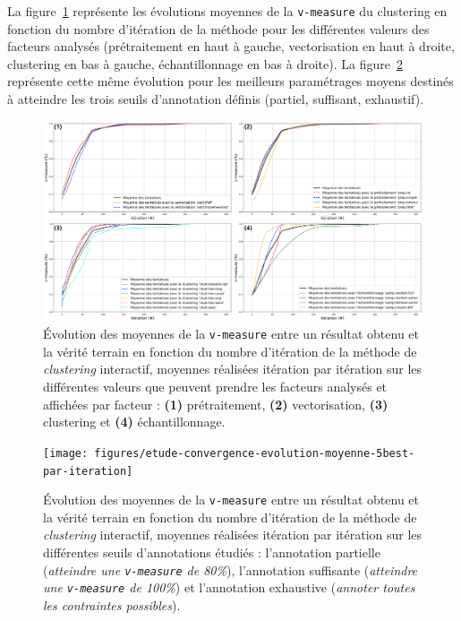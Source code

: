			
				La figure~\ref{figure:4.2.1-ETUDE-CONVERGENCE-EVOLUTION-PAR-FACTEURS} représente les évolutions moyennes de la \texttt{v-measure} du clustering en fonction du nombre d'itération de la méthode pour les différentes valeurs des facteurs analysés (prétraitement en haut à gauche, vectorisation en haut à droite, clustering en bas à gauche, échantillonnage en bas à droite).
				La figure~\ref{figure:4.2.1-ETUDE-CONVERGENCE-EVOLUTION-MEILLEUR-PARAMETRAGE} représente cette même évolution pour les meilleurs paramétrages moyens destinés à atteindre les trois seuils d'annotation définis (partiel, suffisant, exhaustif).
				\begin{figure}[H]
					\centering
					\includegraphics[width=\textwidth]{figures/etude-convergence-evolution-moyenne-par-iteration-par-facteur}
					\caption{Évolution des moyennes de la \texttt{v-measure} entre un résultat obtenu et la vérité terrain en fonction du nombre d'itération de la méthode de \textit{clustering} interactif, moyennes réalisées itération par itération sur les différentes valeurs que peuvent prendre les facteurs analysés et affichées par facteur : \textbf{(1)} prétraitement, \textbf{(2)} vectorisation, \textbf{(3)} clustering et \textbf{(4)} échantillonnage.}
					\label{figure:4.2.1-ETUDE-CONVERGENCE-EVOLUTION-PAR-FACTEURS}
				\end{figure}
				\begin{figure}[H]
					\centering
					\texttt{[image: figures/etude-convergence-evolution-moyenne-5best-par-iteration]}
					\caption{Évolution des moyennes de la \texttt{v-measure} entre un résultat obtenu et la vérité terrain en fonction du nombre d'itération de la méthode de \textit{clustering} interactif, moyennes réalisées itération par itération sur les différentes seuils d'annotations étudiés : l'annotation partielle (\textit{atteindre une \texttt{v-measure} de 80\%}), l'annotation suffisante (\textit{atteindre une \texttt{v-measure} de 100\%}) et l'annotation exhaustive (\textit{annoter toutes les contraintes possibles}).}
					\label{figure:4.2.1-ETUDE-CONVERGENCE-EVOLUTION-MEILLEUR-PARAMETRAGE}
				\end{figure}


